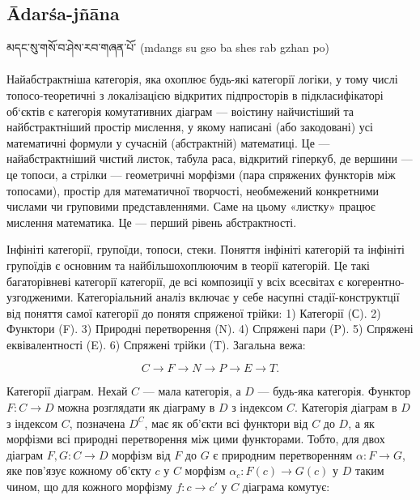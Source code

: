 \newpage
\subsection*{Ādarśa-jñāna}

\ti མདང་སུ་གསོ་བ་ཤེས་རབ་གཞན་པོ་  \ua (mdangs su gso ba shes rab gzhan po)\\
\\
Найабстрактніша категорія, яка охоплює будь-які категорії логіки, у тому числі топосо-теоретичні з локалізацією відкритих підпросторів в підкласифікаторі об‘єктів є категорія комутативних діаграм — воістину найчистіший та найбстрактніший простір мислення, у якому написані (або закодовані) усі математичні формули у сучасній (абстрактній) математиці. Це — найабстрактніший чистий листок, табула раса, відкритий гіперкуб, де вершини — це топоси, а стрілки — геометричні морфізми (пара спряжених функторів між топосами), простір для математичної творчості, необмежений конкретними числами чи груповими представленнями. Саме на цьому «листку» працює мислення математика. Це — перший рівень абстрактності.

Інфініті категорії, групоїди, топоси, стеки. Поняття інфініті категорій та інфініті групоїдів є основним та найбільшохоплюючим в теорії категорій. Це такі багаторівневі категорії категорії, де всі композиції у всіх всесвітах є когерентно-узгодженими. Категоріальний аналіз включає у себе насупні стадії-конструктції від поняття самої категорії до понятя спряженої трійки: 1) Категорії (С). 2) Функтори (F). 3) Природні перетворення (N). 4) Спряжені пари (P). 5) Спряжені еквівалентності (E). 6) Спряжені трійки (T). Загальна вежа:

$$
C \rightarrow F \rightarrow N \rightarrow P \rightarrow E \rightarrow T.
$$

Категорії діаграм. Нехай $C$ --- мала категорія, а $D$ --- будь-яка категорія.
Функтор $F: C \rightarrow D$ можна розглядати як діаграму в $D$ з індексом $C$.
Категорія діаграм в $D$ з індексом $C$, позначена $D^C$, має як об'єкти всі
функтори від $C$ до $D$, а як морфізми всі природні перетворення між цими
функторами. Тобто, для двох діаграм $F,G: C \rightarrow D$ морфізм від $F$
до $G$ є природним перетворенням $\alpha : F \rightarrow G$, яке пов'язує
кожному об'єкту $c$ у $C$ морфізм $\alpha_c : F(c) \rightarrow G(c)$ у $D$
таким чином, що для кожного морфізму $f: c \rightarrow c'$ у $C$ діаграма комутує:

\begin{center}
\end{center}


